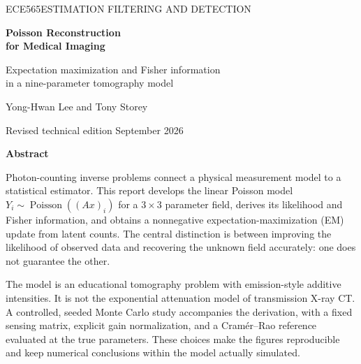 \documentclass[11pt,a4paper]{article}
\newcommand{\Pois}{\operatorname{Poisson}}
\newcommand{\smallnote}[1]{{\small\color{muted}#1\par}}
\begin{document}
\thispagestyle{empty}
{\sffamily\small ECE565\quad ESTIMATION FILTERING AND DETECTION\par}
\vspace{12mm}
{\sffamily\bfseries\fontsize{31}{35}\selectfont
Poisson Reconstruction\\for Medical Imaging\par}
\vspace{5mm}
{\sffamily\large Expectation maximization and Fisher information\\
in a nine-parameter tomography model\par}
\vspace{7mm}
{\large Yong-Hwan Lee and Tony Storey\par}
\smallnote{Revised technical edition September 2026}
\vspace{9mm}

\textbf{Abstract}\par
Photon-counting inverse problems connect a physical measurement model to a statistical estimator. This report develops the linear Poisson model
$Y_i\sim\Pois((Ax)_i)$ for a $3\times3$ parameter field, derives its likelihood and Fisher information, and obtains a nonnegative expectation-maximization (EM) update from latent counts. The central distinction is between improving the likelihood of observed data and recovering the unknown field accurately: one does not guarantee the other.

The model is an educational tomography problem with emission-style additive intensities. It is not the exponential attenuation model of transmission X-ray CT. A controlled, seeded Monte Carlo study accompanies the derivation, with a fixed sensing matrix, explicit gain normalization, and a Cram\'er--Rao reference evaluated at the true parameters. These choices make the figures reproducible and keep numerical conclusions within the model actually simulated.
\end{document}
